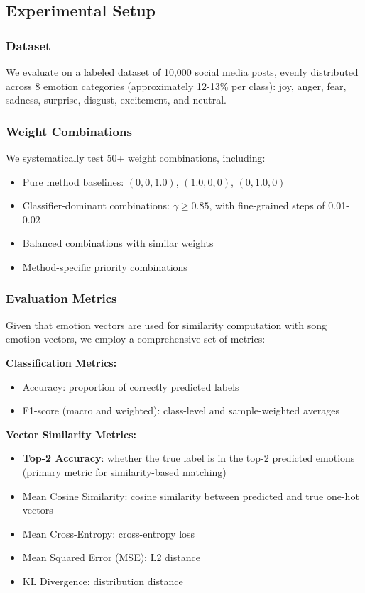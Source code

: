 \subsection{Experimental Setup}
\label{subsec:experimental_setup}

\subsubsection{Dataset}
We evaluate on a labeled dataset of 10,000 social media posts, evenly distributed across 8 emotion categories (approximately 12-13\% per class): joy, anger, fear, sadness, surprise, disgust, excitement, and neutral.

\subsubsection{Weight Combinations}
We systematically test 50+ weight combinations, including:
\begin{itemize}
    \item Pure method baselines: $(0, 0, 1.0)$, $(1.0, 0, 0)$, $(0, 1.0, 0)$
    \item Classifier-dominant combinations: $\gamma \geq 0.85$, with fine-grained steps of 0.01-0.02
    \item Balanced combinations with similar weights
    \item Method-specific priority combinations
\end{itemize}

\subsubsection{Evaluation Metrics}
Given that emotion vectors are used for similarity computation with song emotion vectors, we employ a comprehensive set of metrics:

\textbf{Classification Metrics:}
\begin{itemize}
    \item Accuracy: proportion of correctly predicted labels
    \item F1-score (macro and weighted): class-level and sample-weighted averages
\end{itemize}

\textbf{Vector Similarity Metrics:}
\begin{itemize}
    \item \textbf{Top-2 Accuracy}: whether the true label is in the top-2 predicted emotions (primary metric for similarity-based matching)
    \item Mean Cosine Similarity: cosine similarity between predicted and true one-hot vectors
    \item Mean Cross-Entropy: cross-entropy loss
    \item Mean Squared Error (MSE): L2 distance
    \item KL Divergence: distribution distance
\end{itemize}

